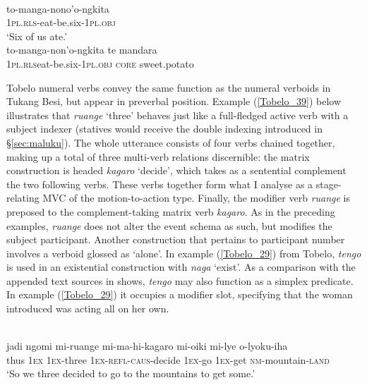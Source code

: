 \ea \label{Tukang_37}
\\
\ea
\gll to-manga-nono'o-ngkita \\
1\textsc{pl}.\textsc{rls}-eat-be.six-1\textsc{pl}.\textsc{obj} \\
\glft `Six of us ate.' \\ 
\ex
\gll *to-manga-non'o-ngkita te mandara \\ 
1\textsc{pl}.\textsc{rls}eat-be.six-1\textsc{pl}.\textsc{obj} \textsc{core} sweet.potato \\
\z
\z

Tobelo numeral verbs convey the same function as the numeral verboids in Tukang Besi, but appear in preverbal position. Example (\ref{Tobelo_39}) below illustrates that \textit{ruange} `three' behaves just like a full-fledged active verb with a subject indexer (statives would receive the double indexing introduced in §\ref{sec:maluku}). The whole utterance consists of four verbs chained together, making up a total of three multi-verb relations discernible: the matrix construction is headed \textit{kagaro} `decide', which takes as a sentential complement the two following verbs. These verbs together form what I analyse as a stage-relating MVC of the motion-to-action type. Finally, the modifier verb \textit{ruange} is preposed to the complement-taking matrix verb \textit{kagaro}. As in the preceding examples, \textit{ruange} does not alter the event schema as such, but modifies the subject participant. Another construction that pertains to participant number involves a verboid glossed as `alone'. In example (\ref{Tobelo_29}) from Tobelo, \textit{tengo} is used in an existential construction with \textit{naga} `exist'. As a comparison with the appended text sources in \citet{holton2003tobelo} shows, \textit{tengo} may also function as a simplex predicate. In example (\ref{Tobelo_29}) it occupies a modifier slot, specifying that the woman introduced was acting all on her own. 

\ea \label{Tobelo_39}
\\
\gll jadi  ngomi mi-ruange mi-ma-hi-kagaro mi-oiki mi-lye o-lyoku-iha \\
thus 1\textsc{ex} 1\textsc{ex}-three 1\textsc{ex}-\textsc{refl}-\textsc{caus}-decide 1\textsc{ex}-go 1\textsc{ex}-get \textsc{nm}-mountain-\textsc{land} \\
\glft `So we three decided to go to the mountains to get some.'\\ 
\z

